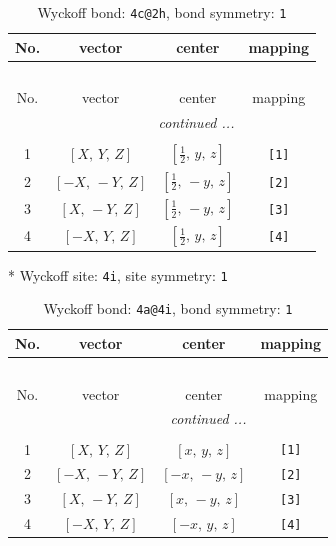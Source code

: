 \documentclass[fleqn,8pt]{jsarticle}
\begin{document}
\begin{longtable}{cccc}
\caption{Wyckoff bond: {\tt 4c@2h}, bond symmetry: {\tt 1}}
 \\
 \hline \hline
No. & vector & center & mapping \\ \hline \endfirsthead

\multicolumn{3}{l}{\tablename\ \thetable{}} \\
 \hline \hline
No. & vector & center & mapping \\ \hline \endhead

 \hline \hline
\multicolumn{3}{r}{\footnotesize\it continued ...} \\ \endfoot

 \hline \hline
\multicolumn{3}{r}{} \\ \endlastfoot

1 & $\left[ X,\, Y,\, Z \right]$ & $\left[ \frac{1}{2},\, y,\, z \right]$ & {\tt [1]} \\ \hline
2 & $\left[ - X,\, - Y,\, Z \right]$ & $\left[ \frac{1}{2},\, - y,\, z \right]$ & {\tt [2]} \\ \hline
3 & $\left[ X,\, - Y,\, Z \right]$ & $\left[ \frac{1}{2},\, - y,\, z \right]$ & {\tt [3]} \\ \hline
4 & $\left[ - X,\, Y,\, Z \right]$ & $\left[ \frac{1}{2},\, y,\, z \right]$ & {\tt [4]} \\
\end{longtable}
* Wyckoff site: {\tt 4i}, site symmetry: {\tt 1}
\renewcommand{\arraystretch}{1.2}
\begin{longtable}{cccc}
\caption{Wyckoff bond: {\tt 4a@4i}, bond symmetry: {\tt 1}}
 \\
 \hline \hline
No. & vector & center & mapping \\ \hline \endfirsthead

\multicolumn{3}{l}{\tablename\ \thetable{}} \\
 \hline \hline
No. & vector & center & mapping \\ \hline \endhead

 \hline \hline
\multicolumn{3}{r}{\footnotesize\it continued ...} \\ \endfoot

 \hline \hline
\multicolumn{3}{r}{} \\ \endlastfoot

1 & $\left[ X,\, Y,\, Z \right]$ & $\left[ x,\, y,\, z \right]$ & {\tt [1]} \\ \hline
2 & $\left[ - X,\, - Y,\, Z \right]$ & $\left[ - x,\, - y,\, z \right]$ & {\tt [2]} \\ \hline
3 & $\left[ X,\, - Y,\, Z \right]$ & $\left[ x,\, - y,\, z \right]$ & {\tt [3]} \\ \hline
4 & $\left[ - X,\, Y,\, Z \right]$ & $\left[ - x,\, y,\, z \right]$ & {\tt [4]} \\
\end{longtable}
\end{document}
